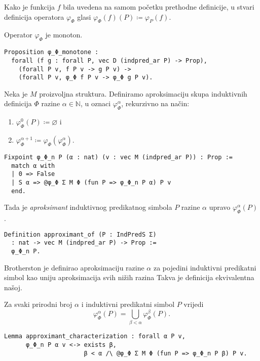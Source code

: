 \begin{remark}
  Kako je funkcija \(f\) bila uvedena na samom početku prethodne definicije,
  u stvari definicija operatora \(\varphi_{\Phi}\) glasi
  \(
    \varphi_{\Phi}(f)(P) \coloneq \varphi_{P}(f)
  \).
\end{remark}


\begin{proposition}
  Operator \(\varphi_{\Phi}\) je monoton.
\begin{verbatim}
Proposition φ_Φ_monotone :
  forall (f g : forall P, vec D (indpred_ar P) -> Prop),
    (forall P v, f P v -> g P v) ->
    (forall P v, φ_Φ f P v -> φ_Φ g P v).
\end{verbatim}
\end{proposition}

\begin{definition}
  Neka je \(M\) proizvoljna struktura.
  Definiramo aproksimaciju skupa induktivnih definicija \(\Phi\) razine \(\alpha \in \mathbb{N}\), u oznaci \(\varphi_{\Phi}^{\alpha}\), rekurzivno na način:
  \begin{enumerate}
  \item \( \varphi_{\Phi}^{0}(P) \coloneq \varnothing \) i
  \item \( \varphi_{\Phi}^{\alpha + 1} \coloneq \varphi_{\Phi}(\varphi_{\Phi}^{\alpha}) \).
  \end{enumerate}
\begin{verbatim}
Fixpoint φ_Φ_n P (α : nat) (v : vec M (indpred_ar P)) : Prop :=
  match α with
  | 0 => False
  | S α => @φ_Φ Σ M Φ (fun P => φ_Φ_n P α) P v
  end.
\end{verbatim}
  \noindent Tada je \textit{aproksimant} induktivnog predikatnog simbola \(P\) razine \(\alpha\) upravo \(\varphi_{\Phi}^{\alpha}(P)\).
\begin{verbatim}
Definition approximant_of (P : IndPredS Σ)
  : nat -> vec M (indpred_ar P) -> Prop :=
  φ_Φ_n P.
\end{verbatim}
\end{definition}

\begin{remark}
  Brotherston je definirao aproksimaciju razine \(\alpha\) za pojedini induktivni predikatni simbol
  kao uniju aproksimacija svih nižih razina
  Takva je definicija ekvivalentna našoj.
\end{remark}

\begin{lemma}\label{lemma:ekvivalentnost-definicija-aproksimacija}
  Za svaki prirodni broj \(\alpha\) i induktivni predikatni simbol \(P\) vrijedi
  \[
    \varphi_{\Phi}^{\alpha}(P) = \bigcup_{\beta < \alpha} \varphi_{\Phi}^{\beta}(P).
  \]
\begin{verbatim}
Lemma approximant_characterization : forall α P v,
      φ_Φ_n P α v <-> exists β,
                      β < α /\ @φ_Φ Σ M Φ (fun P => φ_Φ_n P β) P v.
\end{verbatim}
\end{lemma}

